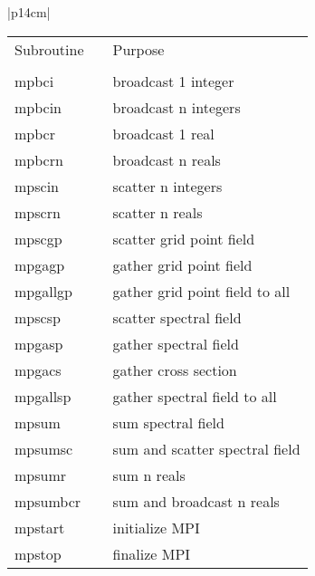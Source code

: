 \begin{center}
\begin{tabular}{|p{14cm}|}
\begin{center}
\begin{tabular}{l p{2cm} l}
Subroutine & &Purpose \\
&& \\
{\sub mpbci} && broadcast 1 integer \\
{\sub mpbcin} & &broadcast n integers \\
{\sub mpbcr} & &broadcast 1 real \\
{\sub mpbcrn} & &broadcast n reals \\
{\sub mpscin} & &scatter n integers \\
{\sub mpscrn} && scatter n reals \\
{\sub mpscgp} && scatter grid point field \\
{\sub mpgagp} && gather grid point field \\
{\sub mpgallgp} && gather grid point field to all \\
{\sub mpscsp} & &scatter spectral field \\
{\sub mpgasp} && gather spectral field \\
{\sub mpgacs} && gather cross section \\
{\sub mpgallsp} && gather spectral field to all \\
{\sub mpsum} && sum spectral field \\
{\sub mpsumsc} && sum and scatter spectral field \\
{\sub mpsumr} && sum n reals \\
{\sub mpsumbcr}& & sum and broadcast n reals \\
{\sub mpstart} & &initialize MPI \\
{\sub mpstop} & &finalize MPI 
\end{tabular}
\end{center}
\end{tabular}
\end{center}

\newpage

